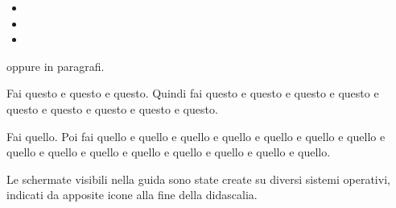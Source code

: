 \begin{itemize}
\item {} 
\item {} 
\item {}
\end{itemize}

oppure in paragrafi.

\nix{} \osx{} Fai questo e questo e questo. Quindi fai questo e questo e questo
e questo e questo e questo e questo e questo e questo.

\win{} Fai quello. Poi fai quello e quello e quello e quello e quello e quello 
e quello  e quello e quello e quello e quello e quello e quello e quello e quello.

Le schermate visibili nella guida sono state create su diversi sistemi operativi,
indicati da apposite icone alla fine della didascalia.



